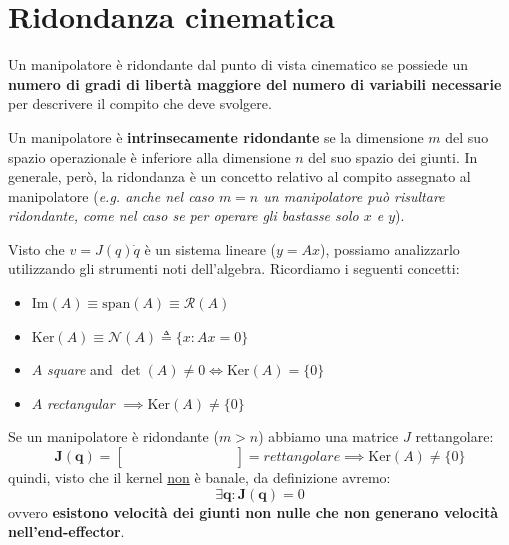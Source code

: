 \section{Ridondanza cinematica}

Un manipolatore è ridondante dal punto di vista cinematico se possiede un \textbf{numero di gradi di libertà maggiore del numero di variabili necessarie} per descrivere il compito che deve svolgere.

Un manipolatore è \textbf{intrinsecamente ridondante} se la dimensione $m$ del suo spazio operazionale è inferiore alla dimensione $n$ del suo spazio dei giunti. In generale, però, la ridondanza è un concetto relativo al compito assegnato al manipolatore (\textit{e.g. anche nel caso $m=n$ un manipolatore può risultare ridondante, come nel caso se per operare gli bastasse solo $x$ e $y$}).

Visto che $v = J(q)\dot{q}$ è un sistema lineare ($y = Ax$), possiamo analizzarlo utilizzando gli strumenti noti dell'algebra. Ricordiamo i seguenti concetti:
\begin{itemize}
	\item $\text{Im}(A) \equiv \text{span}(A) \equiv \mathcal{R}(A)$
	\item $\text{Ker}(A) \equiv \mathcal{N}(A) \triangleq \{ x : Ax = 0 \}$
	\item $A$ \textit{square} and $\det(A)\neq0 \iff \text{Ker}(A)=\{0\}$
	\item $A$ \textit{rectangular} $\implies \text{Ker}(A)\neq{\{0\}}$
\end{itemize}

Se un manipolatore è ridondante ($m > n$) abbiamo una matrice $J$ rettangolare:
$$
\bm{J}(\bm{q})
=
\begin{bmatrix}
	& & & & & & & & & \\
	& & & & & & & & & \\
\end{bmatrix}
=
\textit{rettangolare}
\implies
\text{Ker}(A)\neq{\{0\}}
$$
quindi, visto che il kernel \underline{non} è banale, da definizione avremo:
$$
\exists \bm{q} : \bm{J}(\bm{q}) = 0
$$ 
ovvero \textbf{esistono velocità dei giunti non nulle che non generano velocità nell'end-effector}.


\setlength{\fboxsep}{10pt} %


